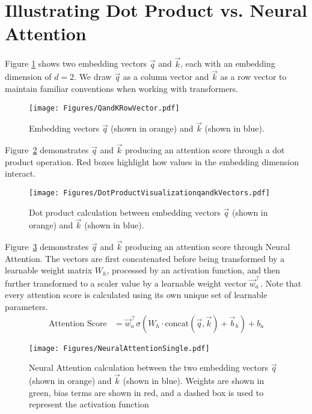 \documentclass{article}
\begin{document}
\section{Illustrating Dot Product vs. Neural Attention}
\label{sec:Illustrations}

Figure \ref{fig:qandk} shows two embedding vectors $\vec{q}$ and $\vec{k}$, each with an embedding dimension of $d=2$. We draw $\vec{q}$ as a column vector and $\vec{k}$ as a row vector to maintain familiar conventions when working with transformers.
\begin{figure}[H]
    \centering
    \texttt{[image: Figures/QandKRowVector.pdf]}
    \caption{Embedding vectors $\vec{q}$ (shown in orange) and $\vec{k}$ (shown in  blue).}
    \label{fig:qandk}
\end{figure}

Figure~\ref{fig:dotproduct} demonstrates $\vec{q}$ and $\vec{k}$ producing an attention score through a dot product operation. Red boxes highlight how values in the embedding dimension interact.

\begin{figure}[H]
    \centering
    \texttt{[image: Figures/DotProductVisualizationqandkVectors.pdf]}
    \caption{Dot product calculation between embedding vectors $\vec{q}$ (shown in orange) and $\vec{k}$ (shown in  blue).}
    \label{fig:dotproduct}
\end{figure}

Figure~\ref{fig:neural_attention_score} demonstrates $\vec{q}$ and $\vec{k}$ producing an attention score through Neural Attention. The vectors are first concatenated before being transformed by a learnable weight matrix $\mathit{W_h}$, processed by an activation function, and then further transformed to a scaler value by a learnable weight vector $\vec{w}_a^\top$. Note that every attention score is calculated using its own unique set of learnable parameters.
\begin{align*}
    \text{Attention Score} &= \vec{w}_a^\top \sigma\left(\mathit{W_h} \cdot \text{concat}(\vec{q}, \vec{k}) + \vec{b}_h\right) + b_a 
\end{align*}
\begin{figure}[H]
    \centering
    \texttt{[image: Figures/NeuralAttentionSingle.pdf]}
    \caption{Neural Attention calculation between the two embedding vectors $\vec{q}$ (shown in orange) and $\vec{k}$ (shown in blue). Weights are shown in green, bias terms are shown in red, and a dashed box is used to represent the activation function}
    \label{fig:neural_attention_score}
\end{figure}
\end{document}

